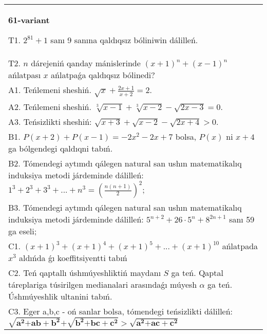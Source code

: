 \documentclass{article}
\begin{document}
\begin{tabular}{m{17cm}}
\textbf{61-variant}
\newline

T1. \(2^{81} + 1\) sanı 9 sanına qaldıqsız bóliniwin dálilleń. \\
T2. \(n\) dárejeniń qanday mánislerinde \((x + 1)^{n} + (x - 1)^{n}\) ańlatpası \(x\) ańlatpaǵa qaldıqsız bólinedi? \\
A1. Teńlemeni sheshiń. \(\sqrt{x} + \frac{2x + 1}{x + 2} = 2\). \\
A2. Teńlemeni sheshiń. \(\sqrt[3]{x - 1} + \sqrt[3]{x - 2} - \sqrt{2x - 3} = 0\). \\
A3. Teńsizlikti sheshiń: \(\sqrt{x + 3} + \sqrt{x - 2} - \sqrt{2x + 4} > 0\). \\
B1. \(P(x + 2) + P(x - 1) = - 2x^{2} - 2x + 7\) bolsa, \(P(x)\) ni \(x + 4\) ga bólgendegi qaldıqni tabıń. \\
B2. Tómendegi aytımdı qálegen natural san ushın matematikalıq induksiya metodi járdeminde dálilleń: \(1^{3} + 2^{3} + 3^{3} + ... + n^{3} = \left( \frac{n(n + 1)}{2} \right)^{2}\); \\
B3. Tómendegi aytımdı qálegen natural san ushın matematikalıq induksiya metodi járdeminde dálilleń: \(5^{n + 2} + 26 \cdot 5^{n} + 8^{2n + 1}\) sanı 59 ga eseli; \\
C1. \((x + 1)^{3} + (x + 1)^{4} + (x + 1)^{5} + ... + (x + 1)^{10}\) ańlatpada \(x^{3}\) aldıńda ǵı koeffitsiyentti tabıń \\
C2. Teń qaptallı úshmúyeshliktiń maydanı \(S\) ga teń. Qaptal táreplariga túsirilgen medianalari arasındaǵı múyesh \(\alpha\) ga teń. Úshmúyeshlik ultanini tabıń. \\
C3. Eger a,b,c - oń sanlar bolsa, tómendegi teńsizlikti dálilleń: \(\sqrt{\mathbf{a}^{\mathbf{2}}\mathbf{+ ab +}\mathbf{b}^{\mathbf{2}}}\mathbf{+}\sqrt{\mathbf{b}^{\mathbf{2}}\mathbf{+ bc +}\mathbf{c}^{\mathbf{2}}}\mathbf{>}\sqrt{\mathbf{a}^{\mathbf{2}}\mathbf{+ ac +}\mathbf{c}^{\mathbf{2}}}\) \\

\end{tabular}
\vspace{1cm}
\end{document}
